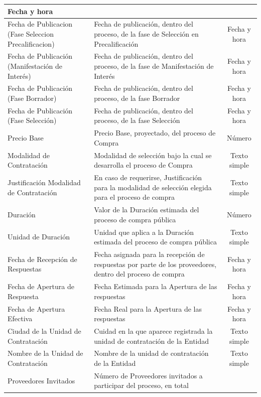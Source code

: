 \documentclass[11pt,letterpaper,oneside]{article}
\begin{document}
\begin{table}[!htp]
\begin{tabular}{|p{3cm}|p{6.5cm}|c|}
		Fecha y hora \\ \hline
		Fecha de Publicacion (Fase Seleccion Precalificacion) &	
		Fecha de publicación, dentro del proceso, de la fase de Selección en Precalificación &
		Fecha y hora \\ \hline
		Fecha de Publicación (Manifestación de Interés) &	
		Fecha de publicación, dentro del proceso, de la fase de Manifestación de Interés &
		Fecha y hora \\ \hline
		Fecha de Publicación (Fase Borrador) &	
		Fecha de publicación, dentro del proceso, de la fase Borrador &
		Fecha y hora \\ \hline
		Fecha de Publicación (Fase Selección) &	
		Fecha de publicación, dentro del proceso, de la fase Selección &
		Fecha y hora \\ \hline
		Precio Base &	
		Precio Base, proyectado, del proceso de Compra &
		Número \\ \hline
		Modalidad de Contratación &	
		Modalidad de selección bajo la cual se desarrolla el proceso de Compra &
		Texto simple \\ \hline
		Justificación Modalidad de Contratación &	
		En caso de requerirse, Justificación para la modalidad de selección elegida para el proceso de compra &
		Texto simple \\ \hline
		Duración &	
		Valor de la Duración estimada del proceso de compra pública &
		Número \\ \hline
		Unidad de Duración &	
		Unidad que aplica a la Duración estimada del proceso de compra pública &
		Texto simple \\ \hline
		Fecha de Recepción de Respuestas &	
		Fecha asignada para la recepción de respuestas por parte de los proveedores, dentro del proceso de compra &
		Fecha y hora \\ \hline
		Fecha de Apertura de Respuesta &	
		Fecha Estimada para la Apertura de las respuestas &
		Fecha y hora \\ \hline
		Fecha de Apertura Efectiva &	
		Fecha Real para la Apertura de las respuestas &
		Fecha y hora \\ \hline
		Ciudad de la Unidad de Contratación &	
		Cuidad en la que aparece registrada la unidad de contratación de la Entidad &
		Texto simple \\ \hline
		Nombre de la Unidad de Contratación &	
		Nombre de la unidad de contratación de la Entidad &
		Texto simple \\ \hline
		Proveedores Invitados &	
		Número de Proveedores invitados a participar del proceso, en total &

\end{tabular}
\end{table}
\end{document}
